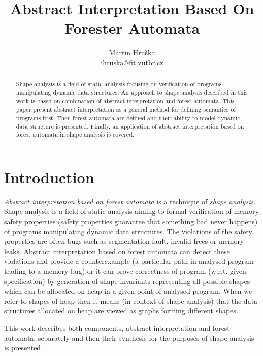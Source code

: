 \documentclass[a4paper, 12pt]{article}
\title{Abstract Interpretation Based On Forester Automata}
\author{Martin Hruška\\ihruska@fit.vutbr.cz}
\date{}
\begin{document}
\maketitle

\begin{abstract}
Shape analysis is a field of static analysis focusing on verification of
programs manipulating dynamic data structures.
An approach to shape analysis described in this work
is based on combination of abstract interpretation and forest automata.
This paper present abstract interpretation as a general method
for defining semantics of programs first.
Then forest automata are defined and their ability
to model dynamic data structure is presented.
Finally, an application of abstract interpretation based on
forest automata in shape analysis is covered. 
\end{abstract}

\tableofcontents

\section{Introduction}
\label{sec:intro}

\emph{Abstract interpretation based on forest automata} is a technique of \emph{shape analysis}.
Shape analysis is a field of static analysis aiming to
formal verification of memory safety properties (safety properties
guarantee that something bad never happens) of
programs manipulating dynamic data structures.
The violations of the safety properties are often bugs
such as segmentation fault, invalid frees or memory leaks.
Abstract interpretation based on forest automata can detect these violations
and provide a counterexample (a particular path in analysed program
leading to a memory bug) or it can prove correctness of program (w.r.t. given specification)
by generation of shape invariants representing all possible shapes which
can be allocated on heap in a given point of analysed program.
When we refer to shapes of heap then it means (in context of shape analysis)
that the data structures allocated on heap are viewed
as graphs forming different shapes.

This work describes both components, abstract interpretation
and forest automata, separately and then their
synthesis for the purposes of shape analysis is presented.
\end{document}
